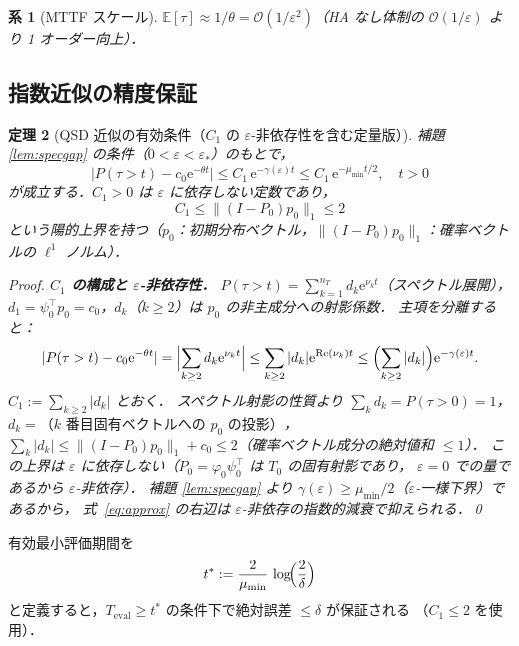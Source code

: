 \documentclass[12pt,a4paper]{article}
\theoremstyle{plain}
\newtheorem{theorem}{定理}[section]
\newtheorem{corollary}[theorem]{系}
\theoremstyle{definition}
\theoremstyle{remark}
\newcommand{\bE}{\mathbb{E}}
\newcommand{\calO}{\mathcal{O}}
\newcommand{\eps}{\varepsilon}
\newcommand{\e}{\mathrm{e}}
\newcommand{\Proj}{P}
\newcommand{\Teval}{T_{\mathrm{eval}}}
\begin{document}
\begin{corollary}[MTTF スケール]\label{cor:mttf}
  $\bE[\tau]\approx1/\theta=\calO(1/\eps^2)$（HA なし体制の $\calO(1/\eps)$ より 1 オーダー向上）．
\end{corollary}

\subsection{指数近似の精度保証}

\begin{theorem}[QSD 近似の有効条件（$C_1$ の $\eps$-非依存性を含む定量版）]\label{thm:QSD_bound}
  補題 \ref{lem:specgap} の条件（$0<\eps<\eps_*$）のもとで，
  \begin{equation}\label{eq:approx}
    \bigl|P(\tau>t) - c_0\e^{-\theta t}\bigr|
    \le C_1\,\e^{-\gamma(\eps)t}
    \le C_1\,\e^{-\mu_{\min}t/2},\quad t>0
  \end{equation}
  が成立する．$C_1>0$ は $\eps$ に依存しない定数であり，
  \begin{equation}\label{eq:C1bound}
    C_1 \le \|(I-\Proj_0)p_0\|_1 \le 2
  \end{equation}
  という陽的上界を持つ（$p_0$：初期分布ベクトル，$\|(I-\Proj_0)p_0\|_1$：確率ベクトルの $\ell^1$ ノルム）．

  \begin{proof}
    \textbf{$C_1$ の構成と $\eps$-非依存性．}
    $P(\tau>t) = \sum_{k=1}^{n_T} d_k\e^{\nu_k t}$（スペクトル展開），
    $d_1 = \psi_0^\top p_0 = c_0$，$d_k$（$k\ge2$）は $p_0$ の非主成分への射影係数．
    主項を分離すると：
    \[
      |P(\tau>t)-c_0\e^{-\theta t}|
      = \Bigl|\sum_{k\ge2} d_k\e^{\nu_k t}\Bigr|
      \le \sum_{k\ge2}|d_k|\e^{\mathrm{Re}(\nu_k)t}
      \le \Bigl(\sum_{k\ge2}|d_k|\Bigr)\e^{-\gamma(\eps)t}.
    \]
    $C_1 := \sum_{k\ge2}|d_k|$ とおく．
    スペクトル射影の性質より $\sum_k d_k = P(\tau>0) = 1$，
    $d_k = \text{（$k$ 番目固有ベクトルへの $p_0$ の投影）}$，
    $\sum_k |d_k| \le \|(I-\Proj_0)p_0\|_1 + c_0 \le 2$（確率ベクトル成分の絶対値和 $\le 1$）．
    この上界は $\eps$ に依存しない（$\Proj_0 = \varphi_0\psi_0^\top$ は $T_0$ の固有射影であり，
    $\eps=0$ での量であるから $\eps$-非依存）．
    補題 \ref{lem:specgap} より $\gamma(\eps)\ge\mu_{\min}/2$（$\eps$-一様下界）であるから，
    式~\eqref{eq:approx} の右辺は $\eps$-非依存の指数的減衰で抑えられる．\qed
  \end{proof}
\end{theorem}

  有効最小評価期間を
  \begin{equation}\label{eq:tstar}
    t^* := \frac{2}{\mu_{\min}}\,\log\!\Bigl(\frac{2}{\delta}\Bigr)
  \end{equation}
  と定義すると，$\Teval \ge t^*$ の条件下で絶対誤差 $\le \delta$ が保証される
  （$C_1\le2$ を使用）．
\end{document}
